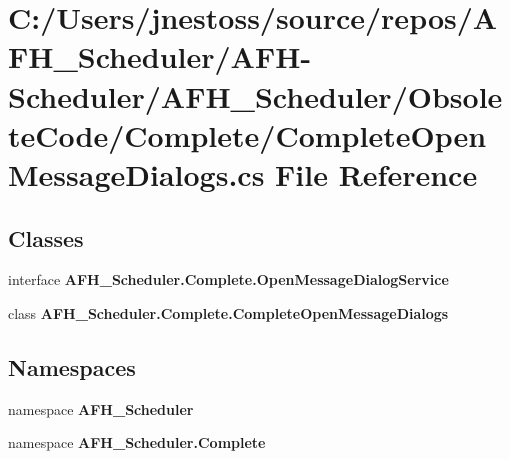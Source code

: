 \section{C\+:/\+Users/jnestoss/source/repos/\+A\+F\+H\+\_\+\+Scheduler/\+A\+F\+H-\/\+Scheduler/\+A\+F\+H\+\_\+\+Scheduler/\+Obsolete\+Code/\+Complete/\+Complete\+Open\+Message\+Dialogs.cs File Reference}
\label{_complete_open_message_dialogs_8cs}
\subsection*{Classes}
\begin{DoxyCompactItemize}
\item 
interface \textbf{ A\+F\+H\+\_\+\+Scheduler.\+Complete.\+Open\+Message\+Dialog\+Service}
\item 
class \textbf{ A\+F\+H\+\_\+\+Scheduler.\+Complete.\+Complete\+Open\+Message\+Dialogs}
\end{DoxyCompactItemize}
\subsection*{Namespaces}
\begin{DoxyCompactItemize}
\item 
namespace \textbf{ A\+F\+H\+\_\+\+Scheduler}
\item 
namespace \textbf{ A\+F\+H\+\_\+\+Scheduler.\+Complete}
\end{DoxyCompactItemize}
